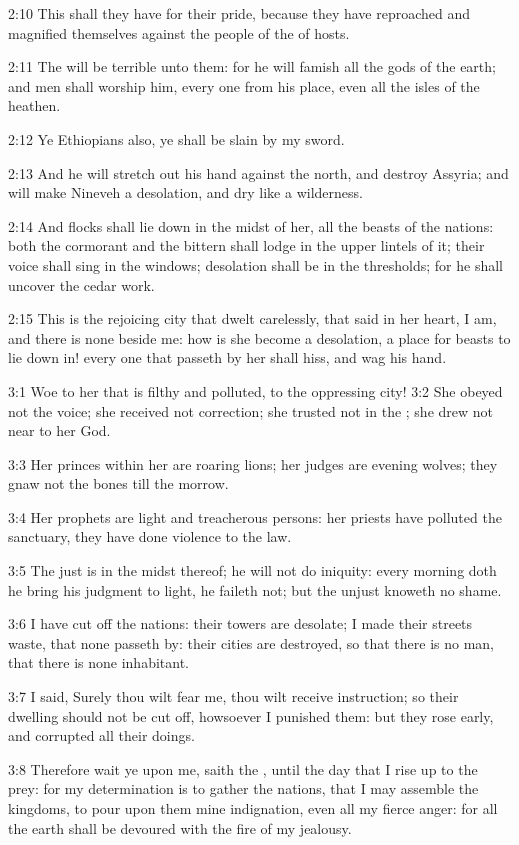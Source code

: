 2:10 This shall they have for their pride, because they have reproached and magnified themselves against the people of the \LORD of hosts.

2:11 The \LORD will be terrible unto them: for he will famish all the gods of the earth; and men shall worship him, every one from his place, even all the isles of the heathen.

2:12 Ye Ethiopians also, ye shall be slain by my sword.

2:13 And he will stretch out his hand against the north, and destroy Assyria; and will make Nineveh a desolation, and dry like a wilderness.

2:14 And flocks shall lie down in the midst of her, all the beasts of the nations: both the cormorant and the bittern shall lodge in the upper lintels of it; their voice shall sing in the windows; desolation shall be in the thresholds; for he shall uncover the cedar work.

2:15 This is the rejoicing city that dwelt carelessly, that said in her heart, I am, and there is none beside me: how is she become a desolation, a place for beasts to lie down in! every one that passeth by her shall hiss, and wag his hand.

3:1 Woe to her that is filthy and polluted, to the oppressing city!  3:2 She obeyed not the voice; she received not correction; she trusted not in the \LORD; she drew not near to her God.

3:3 Her princes within her are roaring lions; her judges are evening wolves; they gnaw not the bones till the morrow.

3:4 Her prophets are light and treacherous persons: her priests have polluted the sanctuary, they have done violence to the law.

3:5 The just \LORD is in the midst thereof; he will not do iniquity: every morning doth he bring his judgment to light, he faileth not; but the unjust knoweth no shame.

3:6 I have cut off the nations: their towers are desolate; I made their streets waste, that none passeth by: their cities are destroyed, so that there is no man, that there is none inhabitant.

3:7 I said, Surely thou wilt fear me, thou wilt receive instruction; so their dwelling should not be cut off, howsoever I punished them: but they rose early, and corrupted all their doings.

3:8 Therefore wait ye upon me, saith the \LORD, until the day that I rise up to the prey: for my determination is to gather the nations, that I may assemble the kingdoms, to pour upon them mine indignation, even all my fierce anger: for all the earth shall be devoured with the fire of my jealousy.

